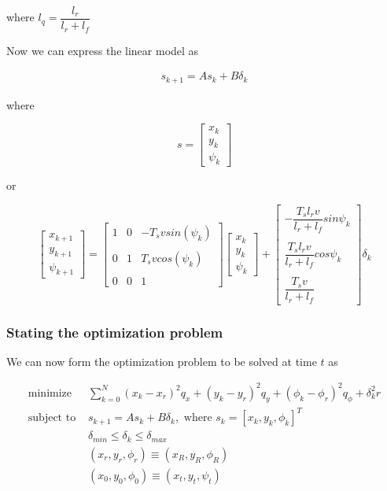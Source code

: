where $l_q = \dfrac{l_r}{l_r + l_f}$




Now we can express the linear model as

\begin{align}
  s_{k+1} = A s_k + B \delta_k
\end{align}

where

\begin{equation}
  s=
  \begin{bmatrix}
    x_{k} \\
    y_{k} \\
    \psi_{k}
  \end{bmatrix}
\end{equation}

or

\begin{equation}
  \begin{bmatrix}
    x_{k+1} \\
    y_{k+1} \\
    \psi_{k+1}
  \end{bmatrix}
  =
  \begin{bmatrix}
    1 & 0 & -T_s v sin(\psi_k) \\\\
    0 & 1 & T_s v cos(\psi_k) \\\\
    0 & 0 & 1
  \end{bmatrix}
  \begin{bmatrix}
    x_{k} \\
    y_{k} \\
    \psi_{k}
  \end{bmatrix}
  +
  \begin{bmatrix}
    -\dfrac{T_s l_r v}{l_r + l_f} sin\psi_k \\\\
    \dfrac{T_s l_r v}{l_r + l_f} cos\psi_k \\\\
    \dfrac{T_s v}{l_r+l_f}
  \end{bmatrix}
  \delta_{k}
\end{equation}



\subsubsection{Stating the optimization problem}

We can now form the optimization problem to be solved at time $t$ as

\begin{align}
  \text{minimize }    & \sum\limits_{k=0}^N (x_k-x_r)^2 q_x + (y_k-y_r)^2 q_y + (\phi_k-\phi_r)^2 q_{\phi} + \delta_k^2 r \\
  \text{subject to }  & s_{k+1} = A s_k + B \delta_k,\text{ where } s_k = [x_k, y_k, \phi_k]^T \\
                      & \delta_{min} \leq \delta_k \leq \delta_{max} \\
                      & (x_r, y_r, \phi_r) \equiv (x_R, y_R, \phi_R) \\
                      & (x_0, y_0, \phi_0) \equiv (x_t, y_t, \psi_t)
\end{align}
